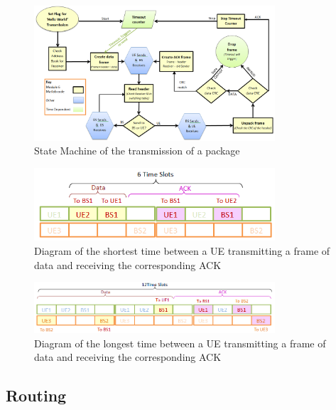 \begin{figure}[ht]
    \centering
    \includegraphics[width=0.8\textwidth]{State_Machine_yellow.PNG}
    \caption{State Machine of the transmission of a package }
    \label{fig:stateMachine}
\end{figure}

\begin{figure}[ht]
    \centering
    \includegraphics[width=0.8\textwidth]{ACK_timeout_short.PNG}
    \caption{Diagram of the shortest time between a UE transmitting a frame of data and receiving the corresponding ACK}
    \label{fig:ACKtimeshort}
\end{figure}

\begin{figure}[ht]
    \centering
    \includegraphics[width=0.8\textwidth]{ACK_timeout_long.PNG}
    \caption{Diagram of the longest time between a UE transmitting a frame of data and receiving the corresponding ACK}
    \label{fig:ACKtimelong}
\end{figure}





\subsection {Routing}

